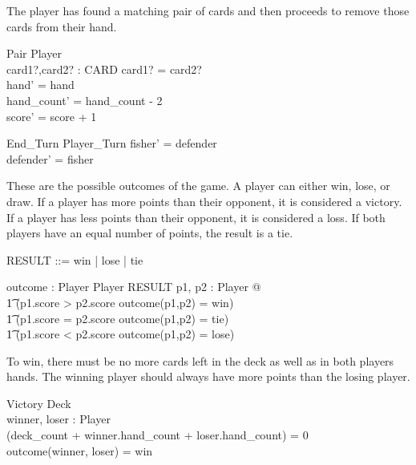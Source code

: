 \documentclass{article}
\begin{document}
The player has found a matching pair of cards and then proceeds
to remove those cards from their hand.
\begin{schema}{Pair}
    \Delta Player \\
    card1?,card2? : CARD
    \where
    card1? = card2? \\
    hand' = hand  \\ 
    hand\_count' = hand\_count - 2 \\
    score' = score + 1
\end{schema}

\begin{schema}{End\_Turn}
    \Delta Player\_Turn
    \where
    fisher' = defender \\
    defender' = fisher
\end{schema}

These are the possible outcomes of the game. A player can
either win, lose, or draw. If a player has more points than their
opponent, it is considered a victory. If a player has less points
than their opponent, it is considered a loss. If both players have
an equal number of points, the result is a tie.

\begin{zed}
    RESULT ::= win | lose | tie
\end{zed}

\begin{axdef}
    outcome : Player \cross Player \fun RESULT
    \where
    \forall p1, p2 : Player @\\
    \t1 (p1.score > p2.score \land outcome(p1,p2) = win) \lor \\
    \t1 (p1.score = p2.score \land outcome(p1,p2) = tie) \lor \\
    \t1 (p1.score < p2.score \land outcome(p1,p2) = lose)
\end{axdef}

To win, there must be no more cards left in the deck as well as
in both players hands. The winning player should always have more
points than the losing player.
\begin{schema}{Victory}
    \Xi Deck \\
    winner, loser : Player \\
    \where
    (deck\_count + winner.hand\_count + loser.hand\_count) = 0\\
    outcome(winner, loser) = win\\
\end{schema}
\end{document}
